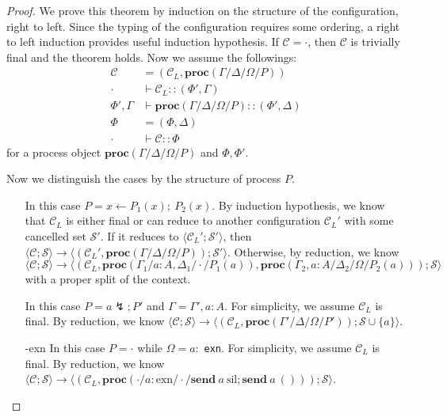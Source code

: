 \documentclass[12pt, openany]{memoir}
\newcommand*{\send}[2]{\textbf{send}\ #1\ #2}
\newcommand*{\cancel}[1]{#1 \lightning}
\newcommand*{\spawn}[3]{#3 \leftarrow #1(#3);\ #2(#3)}
\newcommand*{\procObj}[4]{\textbf{proc}(#1/#2/#3/#4)}
\newcommand*{\config}[0]{\mathcal{C}}
\newcommand*{\cancelSet}[0]{\mathcal{S}}
\begin{document}
\begin{proof}
  We prove this theorem by induction on the structure of the configuration, right to left.
  Since the typing of the configuration requires some ordering, a right to left induction provides useful induction hypothesis.
  If $\config = \cdot$, then $\config$ is trivially final and the theorem holds.
  Now we assume the followings: 
  \begin{align*}
    \config &= (\config_L, \procObj{\Gamma}{\Delta}{\Omega}{P}) \\
    \cdot & \vdash \config_L :: (\Phi', \Gamma) \\
    \Phi', \Gamma & \vdash \procObj{\Gamma}{\Delta}{\Omega}{P} :: (\Phi', \Delta) \\
    \Phi & = (\Phi, \Delta) \\
    \cdot & \vdash \config :: \Phi
  \end{align*}
  for a process object $\procObj{\Gamma}{\Delta}{\Omega}{P}$ and $\Phi, \Phi'$.
  
  Now we distinguish the cases by the structure of process $P$.
  \begin{itemize}
    \item [\ruleref{cut}] In this case $P = \spawn{P_1}{P_2}{x}$. By induction hypothesis,
    we know that $\config_L$ is either final or can reduce to another configuration $\config_L'$ with some cancelled set $\cancelSet'$.
    If it reduces to $\langle \config_L'; \cancelSet' \rangle$, then $\langle \config; \cancelSet \rangle \longrightarrow 
    \langle (\config_L', \procObj{\Gamma}{\Delta}{\Omega}{P}); \cancelSet' \rangle$.
    Otherwise, by reduction, we know $\langle \config; \cancelSet \rangle \longrightarrow
    \langle (\config_L, \procObj{\Gamma_1}{a : A, \Delta_1}{\cdot}{P_1(a)}, \procObj{\Gamma_2, a : A}{\Delta_2}{\Omega}{P_2(a)}); \cancelSet \rangle$
    with a proper split of the context.
    \item [\ruleref{weakenL}] In this case $P = \cancel{a}; P'$ and $\Gamma = \Gamma', a : A$. 
    For simplicity, we assume $\config_L$ is final.
    By reduction, we know $\langle \config; \cancelSet \rangle \longrightarrow \langle (\config_L, \procObj{\Gamma'}{\Delta}{\Omega}{P'}); \cancelSet \cup \{a\} \rangle$.
    \item [\ruleref{nothing}-exn] In this case $P = \cdot$ while $\Omega = a :$ \texttt{exn}.
    For simplicity, we assume $\config_L$ is final.
    By reduction, we know $\langle \config; \cancelSet \rangle \longrightarrow \langle (\config_L, \procObj{\cdot}{a : \text{exn}}{\cdot}{\send{a}{\text{sil}}; \send{a}{()}}); \cancelSet \rangle$.
  \end{itemize}
\end{proof}
\end{document}
